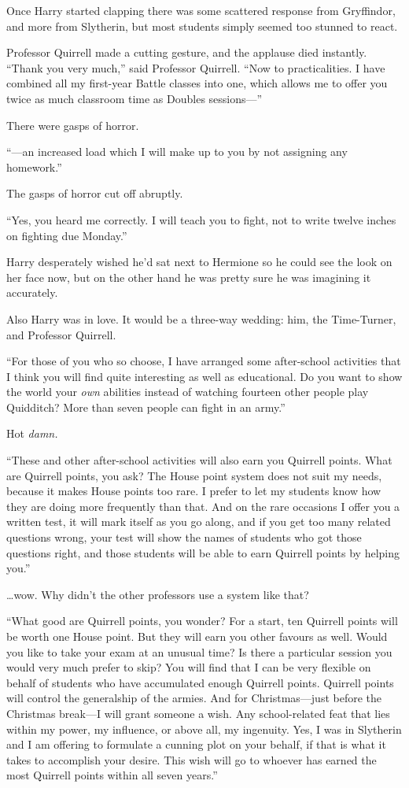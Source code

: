 Once Harry started clapping there was some scattered response from Gryffindor, and more from Slytherin, but most students simply seemed too stunned to react.

Professor Quirrell made a cutting gesture, and the applause died instantly. “Thank you very much,” said Professor Quirrell. “Now to practicalities. I have combined all my first-year Battle classes into one, which allows me to offer you twice as much classroom time as Doubles sessions—”

There were gasps of horror.

“—an increased load which I will make up to you by not assigning any homework.”

The gasps of horror cut off abruptly.

“Yes, you heard me correctly. I will teach you to fight, not to write twelve inches on fighting due Monday.”

Harry desperately wished he’d sat next to Hermione so he could see the look on her face now, but on the other hand he was pretty sure he was imagining it accurately.

Also Harry was in love. It would be a three-way wedding: him, the Time-Turner, and Professor Quirrell.

“For those of you who so choose, I have arranged some after-school activities that I think you will find quite interesting as well as educational. Do you want to show the world your \emph{own} abilities instead of watching fourteen other people play Quidditch? More than seven people can fight in an army.”

Hot \emph{damn.}

“These and other after-school activities will also earn you Quirrell points. What are Quirrell points, you ask? The House point system does not suit my needs, because it makes House points too rare. I prefer to let my students know how they are doing more frequently than that. And on the rare occasions I offer you a written test, it will mark itself as you go along, and if you get too many related questions wrong, your test will show the names of students who got those questions right, and those students will be able to earn Quirrell points by helping you.”

…wow. Why didn’t the other professors use a system like that?

“What good are Quirrell points, you wonder? For a start, ten Quirrell points will be worth one House point. But they will earn you other favours as well. Would you like to take your exam at an unusual time? Is there a particular session you would very much prefer to skip? You will find that I can be very flexible on behalf of students who have accumulated enough Quirrell points. Quirrell points will control the generalship of the armies. And for Christmas—just before the Christmas break—I will grant someone a wish. Any school-related feat that lies within my power, my influence, or above all, my ingenuity. Yes, I was in Slytherin and I am offering to formulate a cunning plot on your behalf, if that is what it takes to accomplish your desire. This wish will go to whoever has earned the most Quirrell points within all seven years.”

